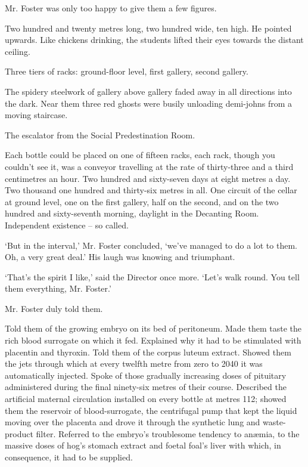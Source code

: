 \documentclass[10pt,a4paper]{article}
\newcommand{\sqm}[1]{‘#1’}
\begin{document}
Mr. Foster was only too happy to give them a few figures.

Two hundred and twenty metres long, two hundred wide, ten high. He pointed upwards. Like chickens drinking, the students lifted their eyes towards the distant ceiling.

Three tiers of racks: ground-floor level, first gallery, second gallery.

The spidery steelwork of gallery above gallery faded away in all directions into the dark. Near them three red ghosts were busily unloading demi-johns from a moving staircase.

The escalator from the Social Predestination Room.

Each bottle could be placed on one of fifteen racks, each rack, though you couldn't see it, was a conveyor travelling at the rate of thirty-three and a third centimetres an hour. Two hundred and sixty-seven days at eight metres a day. Two thousand one hundred and thirty-six metres in all. One circuit of the cellar at ground level, one on the first gallery, half on the second, and on the two hundred and sixty-seventh morning, daylight in the Decanting Room. Independent existence – so called.

\sqm{But in the interval,} Mr. Foster concluded, \sqm{we've managed to do a lot to them. Oh, a very great deal.} His laugh was knowing and triumphant.

\sqm{That's the spirit I like,} said the Director once more. \sqm{Let's walk round. You tell them everything, Mr. Foster.}

Mr. Foster duly told them.

Told them of the growing embryo on its bed of peritoneum. Made them taste the rich blood surrogate on which it fed. Explained why it had to be stimulated with placentin and thyroxin. Told them of the corpus luteum extract. Showed them the jets through which at every twelfth metre from zero to 2040 it was automatically injected. Spoke of those gradually increasing doses of pituitary administered during the final ninety-six metres of their course. Described the artificial maternal circulation installed on every bottle at metres 112; showed them the reservoir of blood-surrogate, the centrifugal pump that kept the liquid moving over the placenta and drove it through the synthetic lung and waste-product filter. Referred to the embryo's troublesome tendency to anæmia, to the massive doses of hog's stomach extract and foetal foal's liver with which, in consequence, it had to be supplied.
\end{document}
